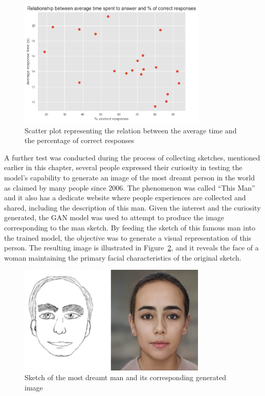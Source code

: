 \begin{figure}[!ht]
  \centering
  \includegraphics[width=0.8\textwidth]{figures/RISULTATI/relationshipTime-responses.png}
  \caption{Scatter plot representing the relation between the average time and the percentage of correct responses}
  \label{fig:scatter plot relation avg time and percentage of correct responses}
\end{figure}

\noindent A further test was conducted during the process of collecting sketches, mentioned earlier in this chapter, several people expressed their curiosity in testing the model's capability to generate an image of the most dreamt person in the world as claimed by many people since 2006.
The phenomenon was called “This Man” and it also has a dedicate website where people experiences are collected and shared, including the description of this man.
Given the interest and the curiosity generated, the GAN model was used to attempt to produce the image corresponding to the man sketch. By feeding the sketch of this famous man into the trained model, the objective was to generate a visual representation of this person. The resulting image is illustrated in Figure~\ref{fig:this man output}, and it reveals the face of a woman maintaining the primary facial characteristics of the original sketch.

\begin{figure}[!ht]
  \centering
  \includegraphics[width=0.8\textwidth]{figures/RISULTATI/thisMan-output.png}
  \caption{Sketch of the most dreamt man and its corresponding generated image}
  \label{fig:this man output}
\end{figure}